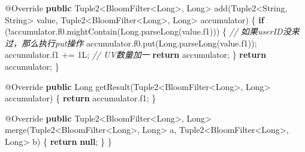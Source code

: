 \documentclass[cn,11pt,chinese]{elegantbook}
\newenvironment{Shaded}{}{}
\newcommand{\AttributeTok}[1]{\textcolor[rgb]{0.49,0.56,0.16}{#1}}
\newcommand{\BuiltInTok}[1]{#1}
\newcommand{\CommentTok}[1]{\textcolor[rgb]{0.38,0.63,0.69}{\textit{#1}}}
\newcommand{\DecValTok}[1]{\textcolor[rgb]{0.25,0.63,0.44}{#1}}
\newcommand{\FunctionTok}[1]{\textcolor[rgb]{0.02,0.16,0.49}{#1}}
\newcommand{\KeywordTok}[1]{\textcolor[rgb]{0.00,0.44,0.13}{\textbf{#1}}}
\newcommand{\NormalTok}[1]{#1}
\begin{document}
\begin{Shaded}
\begin{Highlighting}[]
        \AttributeTok{@Override}
        \KeywordTok{public}\NormalTok{ Tuple2\textless{}BloomFilter\textless{}}\BuiltInTok{Long}\NormalTok{\textgreater{}, }\BuiltInTok{Long}\NormalTok{\textgreater{} }\FunctionTok{add}\NormalTok{(Tuple2\textless{}}\BuiltInTok{String}\NormalTok{, }\BuiltInTok{String}\NormalTok{\textgreater{} value, Tuple2\textless{}BloomFilter\textless{}}\BuiltInTok{Long}\NormalTok{\textgreater{}, }\BuiltInTok{Long}\NormalTok{\textgreater{} accumulator) \{}
            \KeywordTok{if}\NormalTok{ (!accumulator.}\FunctionTok{f0}\NormalTok{.}\FunctionTok{mightContain}\NormalTok{(}\BuiltInTok{Long}\NormalTok{.}\FunctionTok{parseLong}\NormalTok{(value.}\FunctionTok{f1}\NormalTok{))) \{}
                \CommentTok{// 如果userID没来过，那么执行put操作}
\NormalTok{                accumulator.}\FunctionTok{f0}\NormalTok{.}\FunctionTok{put}\NormalTok{(}\BuiltInTok{Long}\NormalTok{.}\FunctionTok{parseLong}\NormalTok{(value.}\FunctionTok{f1}\NormalTok{));}
\NormalTok{                accumulator.}\FunctionTok{f1}\NormalTok{ += }\DecValTok{1L}\NormalTok{; }\CommentTok{// UV数量加一}
                \KeywordTok{return}\NormalTok{ accumulator;}
\NormalTok{            \}}
            \KeywordTok{return}\NormalTok{ accumulator;}
\NormalTok{        \}}

        \AttributeTok{@Override}
        \KeywordTok{public} \BuiltInTok{Long} \FunctionTok{getResult}\NormalTok{(Tuple2\textless{}BloomFilter\textless{}}\BuiltInTok{Long}\NormalTok{\textgreater{}, }\BuiltInTok{Long}\NormalTok{\textgreater{} accumulator) \{}
            \KeywordTok{return}\NormalTok{ accumulator.}\FunctionTok{f1}\NormalTok{;}
\NormalTok{        \}}

        \AttributeTok{@Override}
        \KeywordTok{public}\NormalTok{ Tuple2\textless{}BloomFilter\textless{}}\BuiltInTok{Long}\NormalTok{\textgreater{}, }\BuiltInTok{Long}\NormalTok{\textgreater{} }\FunctionTok{merge}\NormalTok{(Tuple2\textless{}BloomFilter\textless{}}\BuiltInTok{Long}\NormalTok{\textgreater{}, }\BuiltInTok{Long}\NormalTok{\textgreater{} a, Tuple2\textless{}BloomFilter\textless{}}\BuiltInTok{Long}\NormalTok{\textgreater{}, }\BuiltInTok{Long}\NormalTok{\textgreater{} b) \{}
            \KeywordTok{return} \KeywordTok{null}\NormalTok{;}
\NormalTok{        \}}
\NormalTok{    \}}


\end{Highlighting}
\end{Shaded}
\end{document}
